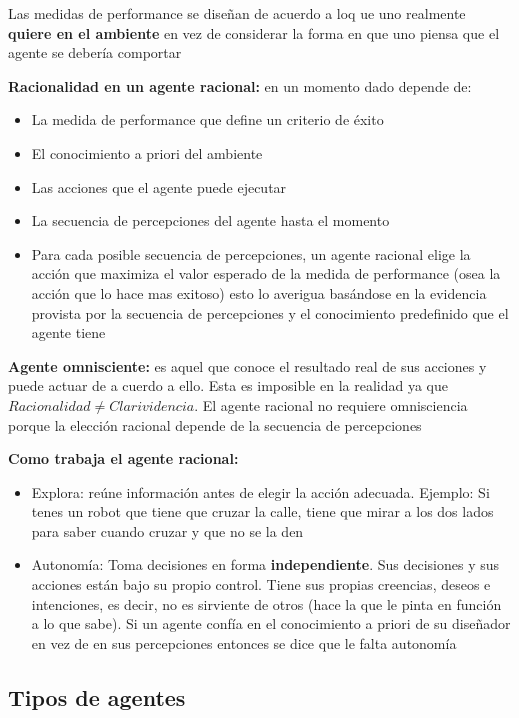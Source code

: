 Las medidas de performance se diseñan de acuerdo a loq ue uno realmente \textbf{quiere en el ambiente} en vez de considerar la forma en que uno piensa que el agente se debería comportar

\textbf{Racionalidad en un agente racional: }en un momento dado depende de:
\begin{itemize}
  \item La medida de performance que define un criterio de éxito
  \item El conocimiento a priori del ambiente
  \item Las acciones que el agente puede ejecutar
  \item La secuencia de percepciones del agente hasta el momento
  \item Para cada posible secuencia de percepciones, un agente racional elige la acción que maximiza el valor esperado de la medida de performance (osea la acción que lo hace mas exitoso) esto lo averigua basándose en la evidencia provista por la secuencia de percepciones y el conocimiento predefinido que el agente tiene
\end{itemize}

\textbf{Agente omnisciente: }es aquel que conoce el resultado real de sus acciones y puede actuar de a cuerdo a ello. Esta es imposible en la realidad ya que $Racionalidad \neq Clarividencia$. El agente racional no requiere omnisciencia porque la elección racional depende de la secuencia de percepciones

\textbf{Como trabaja el agente racional:}
\begin{itemize}
  \item Explora: reúne información antes de elegir la acción adecuada. Ejemplo: Si tenes un robot que tiene que cruzar la calle, tiene que mirar a los dos lados para saber cuando cruzar y que no se la den
  \item Autonomía: Toma decisiones en forma \textbf{independiente}. Sus decisiones y sus acciones están bajo su propio control. Tiene sus propias creencias, deseos e intenciones, es decir, no es sirviente de otros (hace la que le pinta en función a lo que sabe). Si un agente confía en el conocimiento a priori de su diseñador en vez de en sus percepciones entonces se dice que le falta autonomía 
\end{itemize}

\subsection*{Tipos de agentes}
